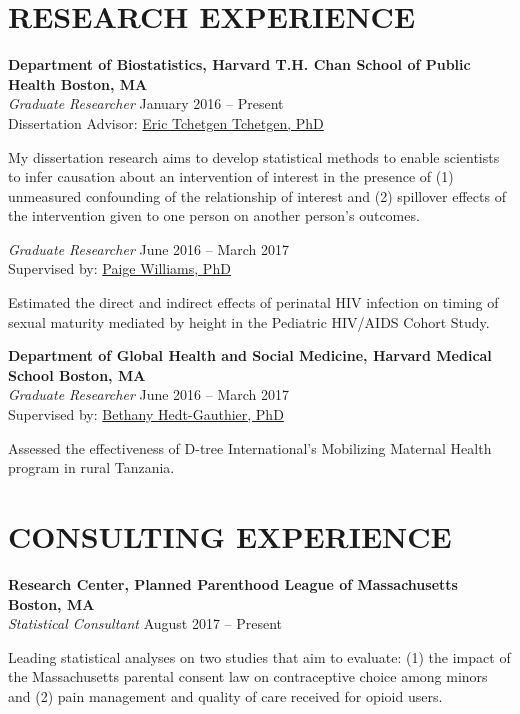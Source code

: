 \documentclass[12pt]{article}
\begin{document}
\section*{\textbf{{\large R}ESEARCH {\large E}XPERIENCE }}

\textbf{Department of Biostatistics, Harvard T.H. Chan School of Public Health \hfill \hfill Boston, MA} \\
\textit{Graduate Researcher}  \hfill \hfill January 2016 -- Present \\
Dissertation Advisor: \href{https://statistics.wharton.upenn.edu/profile/ett/}{Eric Tchetgen Tchetgen, PhD} 
\begin{addmargin}[1em]{2em} My dissertation research aims to develop statistical methods to enable scientists to infer causation about an intervention of interest in the presence of (1) unmeasured confounding of the relationship of interest and (2) spillover effects of the intervention given to one person on another person's outcomes. \end{addmargin} 
\vspace{.2cm}
\textit{Graduate Researcher} \hfill \hfill June 2016 -- March 2017 \\
Supervised by: \href{https://www.hsph.harvard.edu/paige-williams/}{Paige Williams, PhD} 
\begin{addmargin}[1em]{2em}  Estimated the direct and indirect effects of perinatal HIV infection on timing of sexual maturity mediated by height in the Pediatric HIV/AIDS Cohort Study. \end{addmargin} 
\vspace{.2cm}
\textbf{Department of Global Health and Social Medicine, Harvard Medical School \hfill \hfill Boston, MA} \\
\textit{Graduate Researcher} \hfill \hfill June 2016 -- March 2017 \\
Supervised by: \href{http://ghsm.hms.harvard.edu/person/faculty/bethany-hedt-gauthier}{Bethany Hedt-Gauthier, PhD} 
\begin{addmargin}[1em]{2em} Assessed the effectiveness of D-tree International's Mobilizing Maternal Health program in rural Tanzania. \end{addmargin}


\section*{\textbf{{\large C}{ONSULTING} {\large E}{XPERIENCE}}}
\textbf{Research Center, Planned Parenthood League of Massachusetts \hfill \hfill Boston, MA}  \\
\textit{ Statistical Consultant} \hfill \hfill August 2017 -- Present
\begin{addmargin}[1em]{2em} Leading statistical analyses on two studies that aim to evaluate: (1) the impact of the Massachusetts parental consent law on contraceptive choice among minors and (2) pain management and quality of care received for opioid users. \\ \end{addmargin} 
\end{document}
